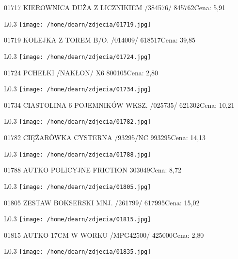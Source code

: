 01717 KIEROWNICA DUŻA Z LICZNIKIEM /384576/           845762Cena: 5,91\newline
\begin{wrapfigure}{L}{0.3\textwidth}
\texttt{[image: /home/dearn/zdjecia/01719.jpg]}
\end{wrapfigure}
01719 KOLEJKA Z TOREM B/O. /014009/                   618517Cena: 39,85\newline
\begin{wrapfigure}{L}{0.3\textwidth}
\texttt{[image: /home/dearn/zdjecia/01724.jpg]}
\end{wrapfigure}
01724 PCHEŁKI /NAKŁON/   X6                           800105Cena: 2,80\newline
\begin{wrapfigure}{L}{0.3\textwidth}
\texttt{[image: /home/dearn/zdjecia/01734.jpg]}
\end{wrapfigure}
01734 CIASTOLINA 6 POJEMNIKÓW WKSZ. /025735/          621302Cena: 10,21\newline
\begin{wrapfigure}{L}{0.3\textwidth}
\texttt{[image: /home/dearn/zdjecia/01782.jpg]}
\end{wrapfigure}
01782 CIĘŻARÓWKA CYSTERNA /93295/NC                   993295Cena: 14,13\newline
\begin{wrapfigure}{L}{0.3\textwidth}
\texttt{[image: /home/dearn/zdjecia/01788.jpg]}
\end{wrapfigure}
01788 AUTKO POLICYJNE FRICTION 303049Cena: 8,72\newline
\begin{wrapfigure}{L}{0.3\textwidth}
\texttt{[image: /home/dearn/zdjecia/01805.jpg]}
\end{wrapfigure}
01805 ZESTAW BOKSERSKI MNJ.  /261799/                 617995Cena: 15,02\newline
\begin{wrapfigure}{L}{0.3\textwidth}
\texttt{[image: /home/dearn/zdjecia/01815.jpg]}
\end{wrapfigure}
01815 AUTKO 17CM W WORKU  /MPG42500/                  425000Cena: 2,80\newline
\begin{wrapfigure}{L}{0.3\textwidth}
\texttt{[image: /home/dearn/zdjecia/01835.jpg]}
\end{wrapfigure}
